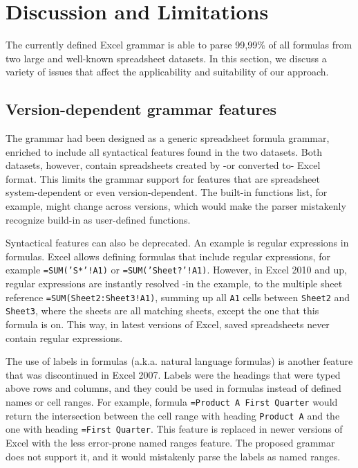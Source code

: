 \documentclass[conference]{IEEEtran}
\begin{document}
\section{Discussion and Limitations}
\label{sec:discussion}
The currently defined Excel grammar is able to parse 99,99\% of all formulas from two large and well-known spreadsheet datasets. In this section, we discuss a variety of issues that affect the applicability and suitability of our approach.

\subsection{Version-dependent grammar features}
The grammar had been designed as a generic spreadsheet formula grammar, enriched to include all syntactical features found in the two datasets. Both datasets, however, contain spreadsheets created by -or converted to- Excel format. This limits the grammar support for features that are spreadsheet system-dependent or even version-dependent. The built-in functions list, for example, might change across versions, which would make the parser mistakenly recognize build-in as user-defined functions.

Syntactical features can also be deprecated. An example is regular expressions in formulas. Excel allows defining formulas that include regular expressions, for example \texttt{=SUM('S*'!A1)} or \texttt{=SUM('Sheet?'!A1)}. However, in Excel 2010 and up, regular expressions are instantly resolved -in the example, to the multiple sheet reference \texttt{=SUM(Sheet2:Sheet3!A1)}, summing up all \texttt{A1} cells between \texttt{Sheet2} and \texttt{Sheet3}, where the sheets are all matching sheets, except the one that this formula is on. This way, in latest versions of Excel, saved spreadsheets never contain regular expressions.

The use of labels in formulas (a.k.a. natural language formulas) is another feature that was discontinued in Excel 2007. Labels were the headings that were typed above rows and columns, and they could be used in formulas instead of defined names or cell ranges. For example, formula \texttt{=Product A First Quarter} would return the intersection between the cell range with heading \texttt{Product A} and the one with heading \texttt{=First Quarter}. This feature is replaced in newer versions of Excel with the less error-prone named ranges feature. The proposed grammar does not support it, and it would mistakenly parse the labels as named ranges.
\end{document}
